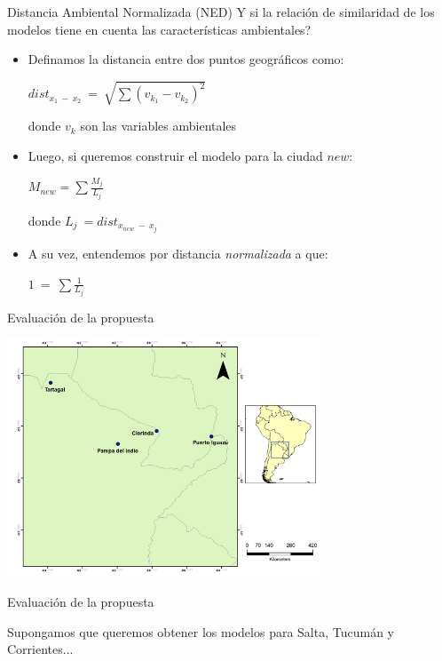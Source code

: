 \documentclass[10pt]{beamer}
\begin{document}
\begin{frame}{Distancia Ambiental Normalizada (NED)}
  Y si la relación de similaridad de los modelos tiene en cuenta las características
  ambientales?
  \pause
  \begin{itemize}[<+->]
    \item Definamos la distancia entre dos puntos geográficos como:
      \begin{center}
        $dist_{x_{1}\ -\ x_{2}} \ =\ \sqrt{\sum{}{(v_{k_{1}} - v_{k_{2}})^{2}}}$
      \end{center}
      donde $v_{k}$ son las variables ambientales

    \item Luego, si queremos construir el modelo para la ciudad $new$:
      \begin{center}
        $M_{new} = \sum{}{\frac{M_{j}}{L_{j}}}$
      \end{center}
      donde $L_{j}\ = dist_{x_{new}\ -\ x_{j}}$
    \item A su vez, entendemos por distancia \textit{normalizada} a que:
    \begin{center}
      $1\ =\ \sum{}{\frac{1}{L_{j}}}$
    \end{center}

  \end{itemize}
\end{frame}


\begin{frame}{Evaluación de la propuesta}
  \begin{center}
    \includegraphics[width=0.7\textwidth]{zonas_ned1}
  \end{center}
\end{frame}


\begin{frame}{Evaluación de la propuesta}
  \fontsize{12}{12}\selectfont

  \begin{center}
    Supongamos que queremos obtener los modelos para Salta, Tucumán y Corrientes...
  \end{center}
\end{frame}
\end{document}
